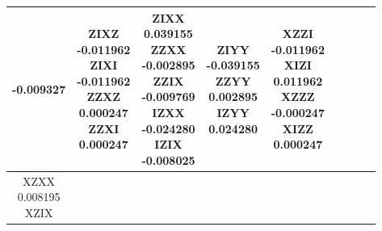 \documentclass[twocolumn]{revtex4-1}
\newcommand{\1}{\mathbbm{1}}
\begin{document}
\begin{longtable}{|c|c|c|c|c|c|c|c|c|}
{-0.009327\\ 
\vspace{.5\baselineskip}}
&
\parbox{1.9cm}{\centering\vspace{.5\baselineskip}
ZIXZ\\
-0.011962\\ 
ZIXI\\
-0.011962\\ 
ZZXZ\\
0.000247\\ 
ZZXI\\
0.000247\\ 
\vspace{.5\baselineskip}}
&
\parbox{1.9cm}{\centering\vspace{.5\baselineskip}
ZIXX\\
0.039155\\ 
ZZXX\\
-0.002895\\ 
ZZIX\\
-0.009769\\ 
IZXX\\
-0.024280\\ 
IZIX\\
-0.008025\\ 
\vspace{.5\baselineskip}}
&
\parbox{1.9cm}{\centering\vspace{.5\baselineskip}
ZIYY\\
-0.039155\\ 
ZZYY\\
0.002895\\ 
IZYY\\
0.024280\\ 
\vspace{.5\baselineskip}}
&
\parbox{1.9cm}{\centering\vspace{.5\baselineskip}
XZZI\\
-0.011962\\ 
XIZI\\
0.011962\\ 
XZZZ\\
-0.000247\\ 
XIZZ\\
0.000247\\ 
\vspace{.5\baselineskip}}\\
\hline
\parbox{1.9cm}{\centering\vspace{.5\baselineskip}
XZXX\\
0.008195\\ 
XZIX\\
}
\end{longtable}
\end{document}
